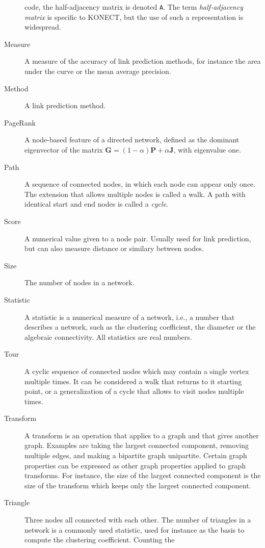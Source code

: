 \documentclass{article}
\begin{document}
\begin{description}
    code, the half-adjacency matrix is denoted \texttt{A}.  The term
    \emph{half-adjacency matrix} is specific to KONECT, but the use of
    such a representation is widespread. 
  \item[Measure]
    A measure of the accuracy of link prediction methods, for instance
    the area under the curve or the mean average precision.  
  \item[Method]
    A link prediction method. 
  \item[PageRank] 
    A node-based feature of a directed network, defined as the dominant
    eigenvector of the matrix $\mathbf G = (1-\alpha) \mathbf P +
    \alpha\mathbf J$, with eigenvalue one. 
  \item[Path]
    A sequence of connected nodes, in which each node can appear only
    once.  The extension that allows multiple nodes is called a walk.  A
    path with identical start and end nodes is called a \emph{cycle}. 
  \item[Score]
    A numerical value given to a node pair.  Usually used for link
    prediction, but can also measure distance or similary between
    nodes. 
  \item[Size]
    The number of nodes in a network.  
  \item[Statistic]
    A statistic is a numerical measure of a network, i.e., a number that
    describes a network, such as the clustering coefficient, the
    diameter or the algebraic connectivity.  All statistics are real
    numbers.   
  \item[Tour]
    A cyclic sequence of connected nodes which may contain a single
    vertex multiple times.  It can be considered a walk that returns to
    it starting point, or a generalization of a cycle that allows to
    visit nodes multiple times.  
  \item[Transform] 
    A transform is an operation that applies to a graph and that gives
    another graph.  Examples are taking the largest connected component,
    removing multiple edges, and making a bipartite graph unipartite.
    Certain graph properties can be expressed as other graph properties
    applied to graph transforms.  For instance, the size of the largest
    connected component is the size of the transform which keeps only
    the largest connected component. 
  \item[Triangle]
    Three nodes all connected with each other.  The number of triangles
    in a network is a commonly used statistic, used for instance as
    the basis to compute the clustering coefficient.  Counting the

\end{description}
\end{document}
